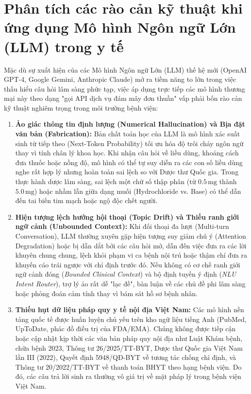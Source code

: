 \section{Phân tích các rào cản kỹ thuật khi ứng dụng Mô hình Ngôn ngữ Lớn (LLM) trong y tế}
\label{sec:llm_limitations}

Mặc dù sự xuất hiện của các Mô hình Ngôn ngữ Lớn (LLM) thế hệ mới (OpenAI GPT-4, Google Gemini, Anthropic Claude) mở ra tiềm năng to lớn trong việc thấu hiểu câu hỏi lâm sàng phức tạp, việc áp dụng trực tiếp các mô hình thương mại này theo dạng "gọi API dịch vụ đám mây đơn thuần" vấp phải bốn rào cản kỹ thuật nghiêm trọng trong môi trường bệnh viện:

\begin{enumerate}[leftmargin=2em]
    \item \textbf{Ảo giác thông tin định lượng (Numerical Hallucination) và Bịa đặt văn bản (Fabrication):}
    Bản chất toán học của LLM là mô hình xác suất sinh từ tiếp theo (Next-Token Probability) tối ưu hóa độ trôi chảy ngôn ngữ thay vì tính chân lý khoa học. Khi nhận câu hỏi về liều dùng, khoảng cách đưa thuốc hoặc nồng độ, mô hình có thể tự suy diễn ra các con số liều dùng nghe rất hợp lý nhưng hoàn toàn sai lệch so với Dược thư Quốc gia. Trong thực hành dược lâm sàng, sai lệch một chữ số thập phân (từ $0.5\,\text{mg}$ thành $5.0\,\text{mg}$) hoặc nhầm lẫn giữa dạng muối (Hydrochloride vs. Base) có thể dẫn đến tai biến tim mạch hoặc ngộ độc chết người.
    
    \item \textbf{Hiện tượng lệch hướng hội thoại (Topic Drift) và Thiếu ranh giới ngữ cảnh (Unbounded Context):}
    Khi đối thoại đa lượt (Multi-turn Conversation), LLM thường xuyên gặp hiện tượng suy giảm chú ý (Attention Degradation) hoặc bị dẫn dắt bởi các câu hỏi mở, dẫn đến việc đưa ra các lời khuyên chung chung, lệch khỏi phạm vi ca bệnh nội trú hoặc thậm chí đưa ra khuyến cáo trái ngược với chỉ định trước đó. Nếu không có cơ chế ranh giới ngữ cảnh đóng (\textit{Bounded Clinical Context}) và bộ định tuyến ý định (\textit{NLU Intent Router}), trợ lý ảo rất dễ "lạc đề", bàn luận về các chủ đề phi lâm sàng hoặc phỏng đoán cảm tính thay vì bám sát hồ sơ bệnh nhân.

    \item \textbf{Thiếu hụt dữ liệu pháp quy y tế nội địa Việt Nam:}
    Các mô hình nền tảng quốc tế được huấn luyện chủ yếu trên kho ngữ liệu tiếng Anh (PubMed, UpToDate, phác đồ điều trị của FDA/EMA). Chúng không được tiếp cận hoặc cập nhật kịp thời các văn bản pháp quy nội địa như Luật Khám bệnh, chữa bệnh 2023, Thông tư 26/2025/TT-BYT, Dược thư Quốc gia Việt Nam lần III (2022), Quyết định 5948/QĐ-BYT về tương tác chống chỉ định, và Thông tư 20/2022/TT-BYT về thanh toán BHYT theo hạng bệnh viện. Do đó, các câu trả lời sinh ra thường vô giá trị về mặt pháp lý trong bệnh viện Việt Nam.
    

\end{enumerate}
